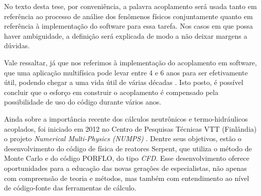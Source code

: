No texto desta tese, 
por conveniência, a palavra acoplamento será usada tanto em referência ao processo de análise dos fenômenos físicos conjuntamente 
quanto em referência à implementação do software para essa tarefa. Nos casos em que possa haver ambiguidade, 
a definição será explicada de modo a não deixar margens a dúvidas.

Vale ressaltar, já que nos referimos à implementação do acoplamento em software, que uma aplicação multifísica 
pode levar entre 4 e 6 anos para ser efetivamente útil, podendo chegar a uma vida útil de várias décadas 
\cite{Graham2004}. Isto posto, é possível concluir que o esforço em construir o acoplamento é compensado 
pela possibilidade de uso do código durante vários anos.

Ainda sobre a importância recente dos cálculos neutrônicos e termo-hidráulicos acoplados, foi iniciado em 2012
no Centro de Pesquisas Técnicas VTT (Finlândia) o projeto \textit{Numerical Multi-Physics (NUMPS)} \cite{Leppanen2015}.
Dentre seus objetivos, estão o desenvolvimento do código de física de reatores Serpent, que utiliza o método de
Monte Carlo e do código PORFLO, do tipo \textit{CFD}. Esse desenvolvimento oferece oportunidades para a educação das novas
gerações de especialistas, não apenas com compreensão de teoria e métodos, mas também com entendimento ao nível de
código-fonte das ferramentas de cálculo.

